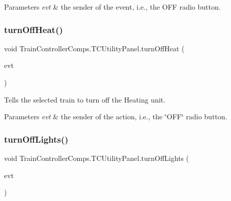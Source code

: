 \begin{DoxyParams}{Parameters}
{\em evt} & the sender of the event, i.\+e., the \textquotesingle{}O\+FF\textquotesingle{} radio button. \\
\hline
\end{DoxyParams}
\mbox{\label{classTrainControllerComps_1_1TCUtilityPanel_a1ff45743a540a22a35ae747e4078984e}} 
\subsubsection{\texorpdfstring{turn\+Off\+Heat()}{turnOffHeat()}}
{\footnotesize\ttfamily void Train\+Controller\+Comps.\+T\+C\+Utility\+Panel.\+turn\+Off\+Heat (\begin{DoxyParamCaption}\item[{java.\+awt.\+event.\+Action\+Event}]{evt }\end{DoxyParamCaption})\hspace{0.3cm}{\ttfamily [private]}}



Tells the selected train to turn off the Heating unit. 


\begin{DoxyParams}{Parameters}
{\em evt} & the sender of the action, i.\+e., the \char`\"{}\+O\+F\+F\char`\"{} radio button. \\
\hline
\end{DoxyParams}
\mbox{\label{classTrainControllerComps_1_1TCUtilityPanel_a7cbaee81557b189ec438ce2bfa954c32}} 
\subsubsection{\texorpdfstring{turn\+Off\+Lights()}{turnOffLights()}}
{\footnotesize\ttfamily void Train\+Controller\+Comps.\+T\+C\+Utility\+Panel.\+turn\+Off\+Lights (\begin{DoxyParamCaption}\item[{java.\+awt.\+event.\+Action\+Event}]{evt }\end{DoxyParamCaption})\hspace{0.3cm}{\ttfamily [private]}}



